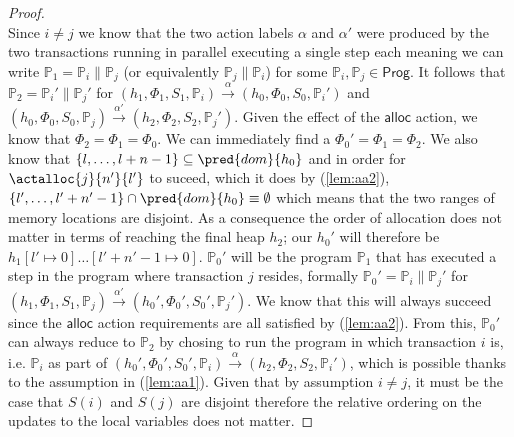 \begin{lem}
\begin{proof}
\[	\]
	Since $i \neq j$ we know that the two action labels $\alpha$ and $\alpha'$ were produced by the two transactions running in parallel executing a single step each meaning we can write $\mathds{P}_1 = \mathds{P}_i \| \mathds{P}_j$ (or equivalently $\mathds{P}_j \| \mathds{P}_i$) for some $\mathds{P}_i, \mathds{P}_j \in \mathsf{Prog}$. It follows that $\mathds{P}_2 = \mathds{P}_i' \| \mathds{P}_j'$ for $(h_1, \Phi_1, S_1, \mathds{P}_i) \xrightarrow{\alpha} (h_0, \Phi_0, S_0, \mathds{P}_i')$ and $(h_0, \Phi_0, S_0, \mathds{P}_j) \xrightarrow{\alpha'} (h_2, \Phi_2, S_2, \mathds{P}_j')$. Given the effect of the $\mathsf{alloc}$ action, we know that $\Phi_2 = \Phi_1 = \Phi_0$. We can immediately find a $\Phi_0' = \Phi_1 = \Phi_2$. We also know that $\{l, \ldots, l + n - 1\} \subseteq \pred{dom}{h_0}$ and in order for $\actalloc{j}{n'}{l'}$ to suceed, which it does by (\ref{lem:aa2}), $\{l', \ldots, l' + n' - 1\} \cap \pred{dom}{h_0} \equiv \emptyset$ which means that the two ranges of memory locations are disjoint. As a consequence the order of allocation does not matter in terms of reaching the final heap $h_2$; our $h_0'$ will therefore be $h_1[l' \mapsto 0]\ldots[l' + n' - 1 \mapsto 0]$. $\mathds{P}_0'$ will be the program $\mathds{P}_1$ that has executed a step in the program where transaction $j$ resides, formally $\mathds{P}_0' = \mathds{P}_i \| \mathds{P}_j'$ for $(h_1, \Phi_1, S_1, \mathds{P}_j) \xrightarrow{\alpha'} (h_0', \Phi_0', S_0', \mathds{P}_j')$. We know that this will always succeed since the $\mathsf{alloc}$ action requirements are all satisfied by (\ref{lem:aa2}). From this, $\mathds{P}_0'$ can always reduce to $\mathds{P}_2$ by chosing to run the program in which transaction $i$ is, i.e. $\mathds{P}_i$ as part of $(h_0', \Phi_0', S_0', \mathds{P}_i) \xrightarrow{\alpha} (h_2, \Phi_2, S_2, \mathds{P}_i')$, which is possible thanks to the assumption in (\ref{lem:aa1}). Given that by assumption $i \neq j$, it must be the case that $S(i)$ and $S(j)$ are disjoint therefore the relative ordering on the updates to the local variables does not matter.
	\end{proof}
\end{lem}

